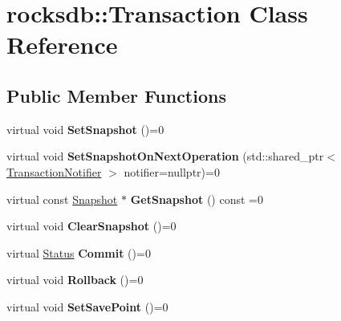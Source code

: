 \hypertarget{classrocksdb_1_1Transaction}{}\section{rocksdb\+:\+:Transaction Class Reference}
\label{classrocksdb_1_1Transaction}
\subsection*{Public Member Functions}
\begin{DoxyCompactItemize}
\item 
virtual void {\bfseries Set\+Snapshot} ()=0\hypertarget{classrocksdb_1_1Transaction_a4cba80b280146fb8cc64c189af2d049b}{}\label{classrocksdb_1_1Transaction_a4cba80b280146fb8cc64c189af2d049b}

\item 
virtual void {\bfseries Set\+Snapshot\+On\+Next\+Operation} (std\+::shared\+\_\+ptr$<$ \hyperlink{classrocksdb_1_1TransactionNotifier}{Transaction\+Notifier} $>$ notifier=nullptr)=0\hypertarget{classrocksdb_1_1Transaction_a9618bb7e74740e5475a71b9b9e98dc50}{}\label{classrocksdb_1_1Transaction_a9618bb7e74740e5475a71b9b9e98dc50}

\item 
virtual const \hyperlink{classrocksdb_1_1Snapshot}{Snapshot} $\ast$ {\bfseries Get\+Snapshot} () const =0\hypertarget{classrocksdb_1_1Transaction_a22e45bc32a03872b91164049bd3a8d46}{}\label{classrocksdb_1_1Transaction_a22e45bc32a03872b91164049bd3a8d46}

\item 
virtual void {\bfseries Clear\+Snapshot} ()=0\hypertarget{classrocksdb_1_1Transaction_a09c1ebe23ba3cea87164cc4330efa254}{}\label{classrocksdb_1_1Transaction_a09c1ebe23ba3cea87164cc4330efa254}

\item 
virtual \hyperlink{classrocksdb_1_1Status}{Status} {\bfseries Commit} ()=0\hypertarget{classrocksdb_1_1Transaction_aa5fd04b98d3e4d8d36b6bffd69e48914}{}\label{classrocksdb_1_1Transaction_aa5fd04b98d3e4d8d36b6bffd69e48914}

\item 
virtual void {\bfseries Rollback} ()=0\hypertarget{classrocksdb_1_1Transaction_ade7f19a5229a9e3744b00fbbd8d463de}{}\label{classrocksdb_1_1Transaction_ade7f19a5229a9e3744b00fbbd8d463de}

\item 
virtual void {\bfseries Set\+Save\+Point} ()=0\hypertarget{classrocksdb_1_1Transaction_aca7700b6ec6e7f1131d518d961ef1b0b}{}\label{classrocksdb_1_1Transaction_aca7700b6ec6e7f1131d518d961ef1b0b}


\end{DoxyCompactItemize}
